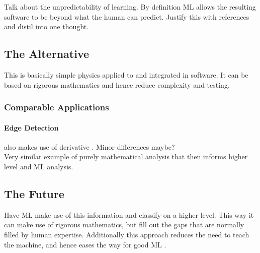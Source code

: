\documentclass[main.tex]{subfiles}
\begin{document}
      Talk about the unpredictability of learning. By definition ML allows the resulting software to be beyond what the human can predict. Justify this with references and distil into one thought.
    
    \subsection{The Alternative}
    
      This is basically simple physics applied to and integrated in software. It can be based on rigorous mathematics and hence reduce complexity and testing.
    
    \subsubsection*{Comparable Applications}
    
      \paragraph{Edge Detection} %
      also makes use of derivative \cite{}. Minor differences maybe? \\
      Very similar example of purely mathematical analysis that then informs higher level and ML analysis.
    
    \subsection{The Future}
    
      Have ML make use of this information and classify on a higher level. This way it can make use of rigorous mathematics, but fill out the gaps that are normally filled by human expertise. Additionally this approach reduces the need to teach the machine, and hence eases the way for good ML \cite{}.
    
\end{document}
